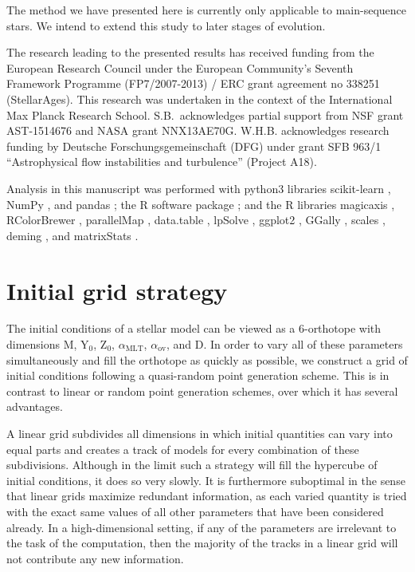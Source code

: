 \documentclass[manuscript,linenumbers]{aastex6}
\begin{document}
The method we have presented here is currently only applicable to main-sequence stars. We intend to extend this study to later stages of evolution. 


\acknowledgments The research leading to the presented results has received funding from the European Research Council under the European Community's Seventh Framework Programme (FP7/2007-2013) / ERC grant agreement no 338251 (StellarAges). This research was undertaken in the context of the International Max Planck Research School. S.B.\ acknowledges partial support from NSF grant AST-1514676 and NASA grant NNX13AE70G.  W.H.B. acknowledges research funding by Deutsche Forschungsgemeinschaft (DFG) under grant SFB 963/1 ``Astrophysical flow instabilities and turbulence'' (Project A18).

Analysis in this manuscript was performed with python3 libraries scikit-learn \citep{scikit-learn}, NumPy \citep{van2011numpy}, and pandas \citep{mckinney2010data}; the R software package \citep{R}; and the R libraries magicaxis \citep{magicaxis}, RColorBrewer \citep{RColorBrewer}, parallelMap \citep{parallelMap}, data.table \citep{data.table}, lpSolve \citep{lpSolve}, ggplot2 \citep{ggplot2}, GGally \citep{GGally}, scales \citep{scales}, deming \citep{deming}, and matrixStats \citep{matrixStats}. 

\appendix


\section{Initial grid strategy}
\label{sec:grid}
The initial conditions of a stellar model can be viewed as a 6-orthotope with dimensions M, Y$_0$, Z$_0$, $\alpha_{\text{MLT}}$, $\alpha_{\text{ov}}$, and D. In order to vary all of these parameters simultaneously and fill the orthotope as quickly as possible, we construct a grid of initial conditions following a quasi-random point generation scheme. This is in contrast to linear or random point generation schemes, over which it has several advantages. 

A linear grid subdivides all dimensions in which initial quantities can vary into equal parts and creates a track of models for every combination of these subdivisions. Although in the limit such a strategy will fill the hypercube of initial conditions, it does so very slowly. It is furthermore suboptimal in the sense that linear grids maximize redundant information, as each varied quantity is tried with the exact same values of all other parameters that have been considered already. In a high-dimensional setting, if any of the parameters are irrelevant to the task of the computation, then the majority of the tracks in a linear grid will not contribute any new information.
\end{document}
